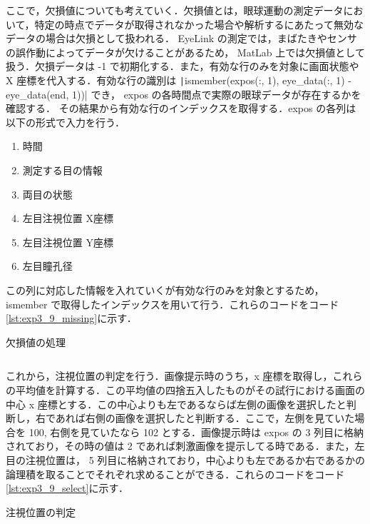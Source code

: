 \documentclass[dvipdfmx, titlepage, t]{jsarticle}
\begin{document}
    ここで，欠損値についても考えていく．欠損値とは，眼球運動の測定データにおいて，特定の時点でデータが取得されなかった場合や解析するにあたって無効なデータの場合は欠損として扱われる． EyeLink の測定では，まばたきやセンサの誤作動によってデータが欠けることがあるため， MatLab 上では欠損値として扱う．欠損データは -1 で初期化する．また，有効な行のみを対象に画面状態や X 座標を代入する．有効な行の識別は \texttt|ismember(expos(:, 1), eye_data(:, 1) - eye_data(end, 1))| でき， expos の各時間点で実際の眼球データが存在するかを確認する．
    その結果から有効な行のインデックスを取得する．expos の各列は以下の形式で入力を行う．
    \begin{enumerate}[label=\arabic*列目]
        \item 時間
        \item 測定する目の情報
        \item 両目の状態
        \item 左目注視位置 X座標
        \item 左目注視位置 Y座標
        \item 左目瞳孔径
    \end{enumerate}
    この列に対応した情報を入れていくが有効な行のみを対象とするため， ismember で取得したインデックスを用いて行う．これらのコードをコード\ref{lst:exp3_9_missing}に示す．

    \begin{program}
        \caption{欠損値の処理}
        \inputminted[linenos,
        firstline=29,
        lastline=48,
        frame=lines,
        fontsize = \small]{matlab}{code/Exp3_9_Matlab.m}
        \label{lst:exp3_9_missing}
    \end{program}

    これから，注視位置の判定を行う．画像提示時のうち，x 座標を取得し，これらの平均値を計算する．この平均値の四捨五入したものがその試行における画面の中心 x 座標とする．この中心よりも左であるならば左側の画像を選択したと判断し，右であれば右側の画像を選択したと判断する．ここで，左側を見ていた場合を 100, 右側を見ていたなら 102 とする．画像提示時は expos の 3 列目に格納されており，その時の値は 2 であれば刺激画像を提示してる時である．また，左目の注視位置は， 5 列目に格納されており，中心よりも左であるか右であるかの論理積を取ることでそれぞれ求めることができる．これらのコードをコード\ref{lst:exp3_9_select}に示す．
    \begin{program}[H]
        \caption{注視位置の判定}
        \inputminted[linenos,
        firstline=50,
        lastline=58,
        frame=lines,
        fontsize = \small]{matlab}{code/Exp3_9_Matlab.m}
        \label{lst:exp3_9_select}
    \end{program}
\end{document}
